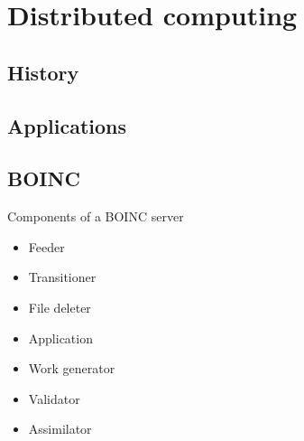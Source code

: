 
\chapter{Distributed computing}
\label{distributed_computing}




\section{History}


\section{Applications}


\section{BOINC}

Components of a BOINC server
\begin{itemize}
	\item Feeder
	\item Transitioner
	\item File deleter
	\item Application
	\item Work generator
	\item Validator
	\item Assimilator
\end{itemize}